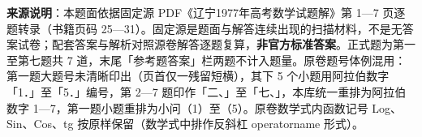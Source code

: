 


\begin{gktip}
\textbf{来源说明}：本题面依据固定源 PDF《辽宁1977年高考数学试题解》第 1—7 页逐题转录（书籍页码 25—31）。固定源是题面与解答连续出现的扫描材料，不是无答案试卷；配套答案与解析对照源卷解答逐题复算，\textbf{非官方标准答案}。正式题为第一至第七题共 7 道，末尾「参考题答案」栏两题不计入题量。原卷题号体例混用：第一题大题号未清晰印出（页首仅一残留短横），其下 5 个小题用阿拉伯数字「1．」至「5．」编号，第 2—7 题印作「二、」至「七、」，本库统一重排为阿拉伯数字 1—7，第一题小题重排为小问（1）至（5）。原卷数学式内函数记号 Log、Sin、Cos、tg 按原样保留（数学式中排作反斜杠 operatorname 形式）。
\end{gktip}

\par\medskip

